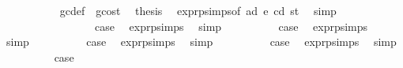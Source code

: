 \begin{isabellebody}
\ \ \ \ \ \ \ \ \isamarkupfalse%
\ {}{}\ gc{\isacharunderscore}{\kern0pt}def\ {\isacharasterisk}{\kern0pt}\ gcost\ \isamarkupfalse%
\ {\isacharquery}{\kern0pt}thesis\ \isamarkupfalse%
\ expr{\isachardot}{\kern0pt}psimps{\isacharparenleft}{\kern0pt}{}{\isacharparenright}{\kern0pt}{\isacharbrackleft}{\kern0pt}of\ ad\ e\ cd\ st{\isacharbrackright}{\kern0pt}\ \isamarkupfalse%
\ simp\isanewline
\ \ \ \ \ \ \isamarkupfalse%
\isanewline
\ \ \ \ \isamarkupfalse%
\isanewline
\ \ \isamarkupfalse%
\isanewline
{}\isamarkupfalse%
\isanewline
\ \ \isamarkupfalse%
\ {}{}\isanewline
\ \ \isamarkupfalse%
\ \isamarkupfalse%
\ {\isacharquery}{\kern0pt}case\ \isamarkupfalse%
\ expr{\isachardot}{\kern0pt}psimps{\isacharparenleft}{\kern0pt}{}{\isacharparenright}{\kern0pt}\ \isamarkupfalse%
\ simp\isanewline
{}\isamarkupfalse%
\isanewline
\ \ \isamarkupfalse%
\ {}{}\isanewline
\ \ \isamarkupfalse%
\ \isamarkupfalse%
\ {\isacharquery}{\kern0pt}case\ \isamarkupfalse%
\ expr{\isachardot}{\kern0pt}psimps{\isacharparenleft}{\kern0pt}{}{\isacharparenright}{\kern0pt}\ \isamarkupfalse%
\ simp\isanewline
{}\isamarkupfalse%
\isanewline
\ \ \isamarkupfalse%
\ {}{}\isanewline
\ \ \isamarkupfalse%
\ \isamarkupfalse%
\ {\isacharquery}{\kern0pt}case\ \isamarkupfalse%
\ expr{\isachardot}{\kern0pt}psimps{\isacharparenleft}{\kern0pt}{}{\isacharparenright}{\kern0pt}\ \isamarkupfalse%
\ simp\isanewline
{}\isamarkupfalse%
\isanewline
\ \ \isamarkupfalse%
\ {}{}\isanewline
\ \ \isamarkupfalse%
\ \isamarkupfalse%
\ {\isacharquery}{\kern0pt}case\ \isamarkupfalse%
\ expr{\isachardot}{\kern0pt}psimps{\isacharparenleft}{\kern0pt}{}{\isacharparenright}{\kern0pt}\ \isamarkupfalse%
\ simp\isanewline
{}\isamarkupfalse%
\isanewline
\ \ \isamarkupfalse%
\ {}{}\isanewline
\ \ \isamarkupfalse%
\ \isamarkupfalse%
\ {\isacharquery}{\kern0pt}case\ \isamarkupfalse%

\end{isabellebody}
